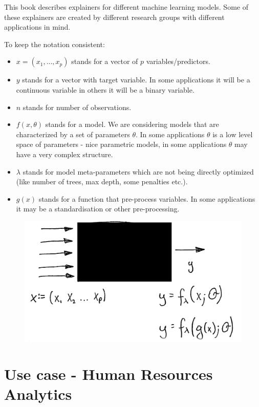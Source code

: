 \documentclass[]{book}
\providecommand{\tightlist}{%
  \setlength{\itemsep}{0pt}\setlength{\parskip}{0pt}}
\theoremstyle{definition}
\theoremstyle{definition}
\theoremstyle{definition}
\theoremstyle{remark}
\begin{document}
This book describes explainers for different machine learning models.
Some of these explainers are created by different research groups with
different applications in mind.

To keep the notation consistent:

\begin{itemize}
\tightlist
\item
  \(x = (x_1, ..., x_p)\) stands for a vector of \(p\)
  variables/predictors.
\item
  \(y\) stands for a vector with target variable. In some applications
  it will be a continuous variable in others it will be a binary
  variable.
\item
  \(n\) stands for number of observations.
\item
  \(f(x, \theta)\) stands for a model. We are considering models that
  are characterized by a set of parameters \(\theta\). In some
  applications \(\theta\) is a low level space of parameters - nice
  parametric models, in some applications \(\theta\) may have a very
  complex structure.
\item
  \(\lambda\) stands for model meta-parameters which are not being
  directly optimized (like number of trees, max depth, some penalties
  etc.).
\item
  \(g(x)\) stands for a function that pre-process variables. In some
  applications it may be a standardisation or other pre-processing.
\end{itemize}

\begin{figure}
\centering
\includegraphics{images/model01.jpg}
\caption{}
\end{figure}

\section{Use case - Human Resources
Analytics}\label{use-case---human-resources-analytics}
\end{document}
